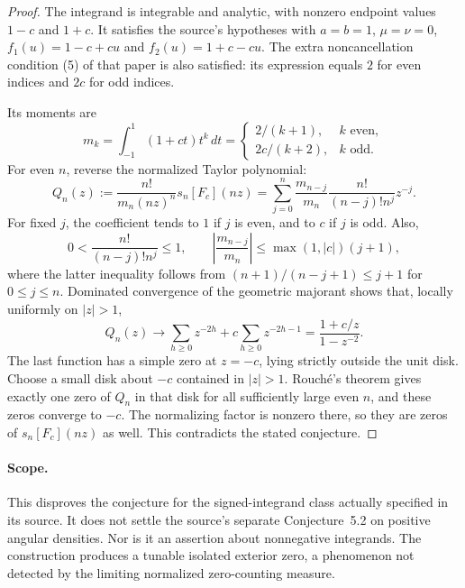 \documentclass[11pt,a4paper]{article}
\theoremstyle{definition}
\theoremstyle{remark}
\numberwithin{equation}{section}
\begin{document}
\begin{proof}
The integrand is integrable and analytic, with nonzero endpoint values
$1-c$ and $1+c$. It satisfies the source's hypotheses with
$a=b=1$, $\mu=\nu=0$,
$f_1(u)=1-c+cu$ and $f_2(u)=1+c-cu$. The extra noncancellation
condition (5) of that paper is also satisfied: its expression equals
$2$ for even indices and $2c$ for odd indices.

Its moments are
\[
 m_k=\int_{-1}^1(1+ct)t^k\,dt
 =\begin{cases}2/(k+1),&k\text{ even},\\
                 2c/(k+2),&k\text{ odd}.
   \end{cases}
\]
For even $n$, reverse the normalized Taylor polynomial:
\[
 Q_n(z):=\frac{n!}{m_n(nz)^n}s_n[F_c](nz)
 =\sum_{j=0}^n\frac{m_{n-j}}{m_n}
    \frac{n!}{(n-j)!n^j}z^{-j}.
\]
For fixed $j$, the coefficient tends to $1$ if $j$ is even, and to
$c$ if $j$ is odd. Also,
\[
 0<\frac{n!}{(n-j)!n^j}\leq1,
 \qquad
 \left|\frac{m_{n-j}}{m_n}\right|
 \leq\max(1,|c|)(j+1),
\]
where the latter inequality follows from
$(n+1)/(n-j+1)\leq j+1$ for $0\leq j\leq n$.
Dominated convergence of the geometric majorant shows that, locally
uniformly on $|z|>1$,
\[
 Q_n(z)\longrightarrow
 \sum_{h\geq0}z^{-2h}+c\sum_{h\geq0}z^{-2h-1}
 =\frac{1+c/z}{1-z^{-2}}.
\]
The last function has a simple zero at $z=-c$, lying strictly outside
the unit disk. Choose a small disk about $-c$ contained in $|z|>1$.
Rouch\'e's theorem gives exactly one zero of $Q_n$ in that disk for
all sufficiently large even $n$, and these zeros converge to $-c$.
The normalizing factor is nonzero there, so they are zeros of
$s_n[F_c](nz)$ as well. This contradicts the stated conjecture.
\end{proof}

\paragraph{Scope.}
This disproves the conjecture for the signed-integrand class actually
specified in its source. It does not settle the source's separate
Conjecture~5.2 on positive angular densities. Nor is it an assertion
about nonnegative integrands. The construction produces a tunable
isolated exterior zero, a phenomenon not detected by the limiting
normalized zero-counting measure.


\end{document}
